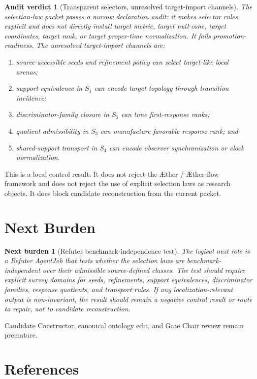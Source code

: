 \documentclass[11pt]{article}
\newcommand{\Aether}{\AE{}ther}
\newcommand{\Aflow}{\AE{}ther-flow}
\newcommand{\TheoryProgram}{\Aether{} / \Aflow{} framework}
\newtheorem{auditverdict}{Audit verdict}
\newtheorem{nextburden}{Next burden}
\begin{document}
\begin{auditverdict}[Transparent selectors, unresolved target-import channels]
The selection-law packet passes a narrow declaration audit: it makes selector
rules explicit and does not directly install target metric, target null-cone,
target coordinates, target rank, or target proper-time normalization. It
fails promotion-readiness. The unresolved target-import channels are:
\begin{enumerate}
    \item source-accessible seeds and refinement policy can select target-like
    local arenas;
    \item support equivalence in \(S_1\) can encode target topology through
    transition incidence;
    \item discriminator-family closure in \(S_2\) can tune first-response
    ranks;
    \item quotient admissibility in \(S_3\) can manufacture favorable response
    rank; and
    \item shared-support transport in \(S_4\) can encode observer
    synchronization or clock normalization.
\end{enumerate}
\end{auditverdict}

This is a local control result. It does not reject the \TheoryProgram{} and
does not reject the use of explicit selection laws as research objects. It
does block candidate reconstruction from the current packet.

\section{Next Burden}

\begin{nextburden}[Refuter benchmark-independence test]
The logical next role is a Refuter AgentJob that tests whether the selection
laws are benchmark-independent over their admissible source-defined classes.
The test should require explicit survey domains for seeds, refinements,
support equivalences, discriminator families, response quotients, and
transport rules. If any localization-relevant output is non-invariant, the
result should remain a negative control result or route to repair, not to
candidate reconstruction.
\end{nextburden}

Candidate Constructor, canonical ontology edit, and Gate Chair review remain
premature.

\section*{References}
\end{document}
